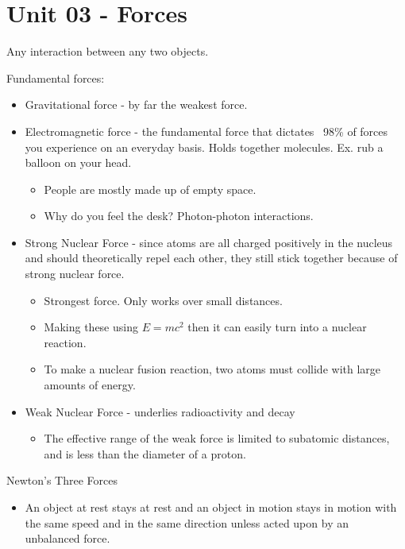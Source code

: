 \documentclass{scrreprt} %
\begin{document}
\section{Unit 03 - Forces}

\begin{definition}[Force]
	Any interaction between any two objects.
\end{definition}

\begin{definition}
	Fundamental forces:

	\begin{itemize}
		\item Gravitational force - by far the weakest force.
		\item Electromagnetic force - the fundamental force that dictates ~98\%
		of forces you experience on an everyday basis. Holds together molecules.
		Ex. rub a balloon on your head.
		\begin{itemize}
			\item People are mostly made up of empty space.
			\item Why do you feel the desk? Photon-photon interactions.
		\end{itemize}
		\item Strong Nuclear Force - since atoms are all charged positively
		in the nucleus and should theoretically repel each other, they still stick
		together because of strong nuclear force.
		\begin{itemize}
			\item Strongest force. Only works over small distances.
			\item Making these using $E=mc^2$ then it can
			easily turn into a nuclear reaction.
			\item To make a nuclear fusion reaction, two atoms must collide with large amounts
			of energy. 
		\end{itemize}
		\item Weak Nuclear Force - underlies radioactivity and decay
		\begin{itemize}
			\item The effective range of the weak force is limited to subatomic
			distances, and is less than the diameter of a proton.
		\end{itemize}
	\end{itemize}
\end{definition}

Newton's Three Forces

\begin{itemize}
	\item An object at rest stays at rest and an object in motion stays in
	motion with the same speed and in the same
	direction unless acted upon by an unbalanced force.
\end{itemize}
\end{document}

